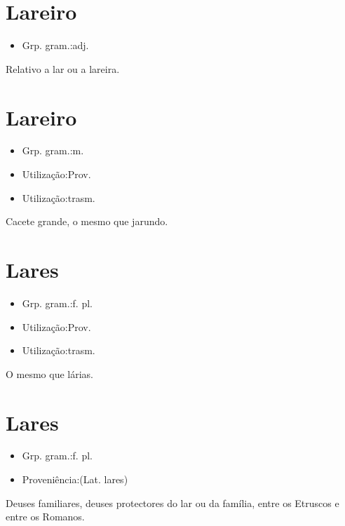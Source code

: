 \section{Lareiro}
\begin{itemize}
\item {Grp. gram.:adj.}
\end{itemize}
Relativo a lar ou a lareira.
\section{Lareiro}
\begin{itemize}
\item {Grp. gram.:m.}
\end{itemize}
\begin{itemize}
\item {Utilização:Prov.}
\end{itemize}
\begin{itemize}
\item {Utilização:trasm.}
\end{itemize}
Cacete grande, o mesmo que \textunderscore jarundo\textunderscore .
\section{Lares}
\begin{itemize}
\item {Grp. gram.:f. pl.}
\end{itemize}
\begin{itemize}
\item {Utilização:Prov.}
\end{itemize}
\begin{itemize}
\item {Utilização:trasm.}
\end{itemize}
O mesmo que \textunderscore lárias\textunderscore .
\section{Lares}
\begin{itemize}
\item {Grp. gram.:f. pl.}
\end{itemize}
\begin{itemize}
\item {Proveniência:(Lat. \textunderscore lares\textunderscore )}
\end{itemize}
Deuses familiares, deuses protectores do lar ou da família, entre os Etruscos e entre os Romanos.
